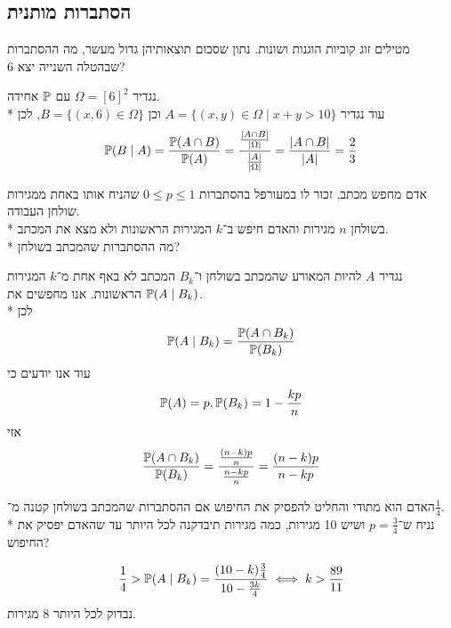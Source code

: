 \subsection{הסתברות מותנית}
\begin{exercise}
	מטילים זוג קוביות הוגנות ושונות. נתון שסכום תוצאותיהן גדול מעשר,
	מה ההסתברות שבהטלה השנייה יצא 6?
\end{exercise}
\begin{solution}
	נגדיר $\Omega = {[6]}^2$ עם $\mathbb{P}$ אחידה. \\*
	עוד נגדיר $A = \{ (x, y) \in \Omega \mid x + y > 10 \}$ וכן $B = \{ (x, 6) \in \Omega \}$, לכן
	\[
		\mathbb{P}(B \mid A)
		= \frac{\mathbb{P}(A \cap B)}{\mathbb{P}(A)}
		= \frac{\frac{|A \cap B|}{|\Omega|}}{\frac{|A|}{|\Omega|}}
		= \frac{|A \cap B|}{|A|} = \frac{2}{3}
	\]
\end{solution}
\begin{exercise}
	אדם מחפש מכתב, זכור לו במעורפל בהסתברות $0 \le p \le 1$ שהניח אותו באחת ממגירות שולחן העבודה. \\*
	בשולחן $n$ מגירות והאדם חיפש ב־$k$ המגירות הראשונות ולא מצא את המכתב. \\*
	מה ההסתברות שהמכתב בשולחן?
\end{exercise}
\begin{solution}
	נגדיר $A$ להיות המאורע שהמכתב בשולחן ו־$B_k$ המכתב לא באף אחת מ־$k$ המגירות הראשונות. אנו מחפשים את $\mathbb{P}(A \mid B_k)$. \\*
	לכן
	\[
		\mathbb{P}(A \mid B_k)
		= \frac{\mathbb{P}(A \cap B_k)}{\mathbb{P}(B_k)}
	\]
	עוד אנו יודעים כי
	\[
		\mathbb{P}(A) = p,
		\mathbb{P}(B_k) = 1 - \frac{kp}{n}
	\]
	אזי
	\[
		\frac{\mathbb{P}(A \cap B_k)}{\mathbb{P}(B_k)}
		= \frac{\frac{(n - k)p}{n}}{\frac{n - kp}{n}}
		= \frac{(n - k) p}{n - kp}
	\]
\end{solution}
\begin{exercise}
	האדם הוא מתודי והחליט להפסיק את החיפוש אם ההסתברות שהמכתב בשולחן קטנה מ־$\frac{1}{4}$. \\*
	נניח ש־$p = \frac{3}{4}$ ושיש 10 מגירות, כמה מגירות תיבדקנה לכל היותר עד שהאדם יפסיק את החיפוש?
\end{exercise}
\begin{solution}
	\[
		\frac{1}{4} > \mathbb{P}(A \mid B_k) = \frac{(10 - k) \frac{3}{4}}{10 - \frac{3k}{4}} \iff k > \frac{89}{11}
	\]
	נבדוק לכל היותר 8 מגירות.
\end{solution}

